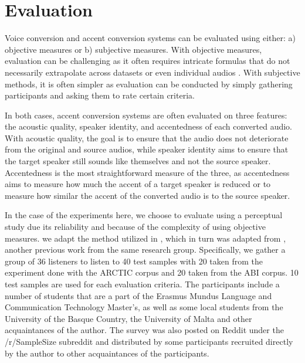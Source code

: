 \documentclass
[
    a4paper,
    twoside,
    12pt,
]
{report}
\begin{document}
\hypertarget{evaluation}{%
\section{Evaluation}\label{evaluation}}

Voice conversion and accent conversion systems can be evaluated using
either: a) objective measures or b) subjective measures. With objective
measures, evaluation can be challenging as it often requires intricate
formulas that do not necessarily extrapolate across datasets or even
individual audios \parencite{felps2010}. With subjective methods, it is
often simpler as evaluation can be conducted by simply gathering
participants and asking them to rate certain criteria.

In both cases, accent conversion systems are often evaluated on three
features: the acoustic quality, speaker identity, and accentedness of
each converted audio. With acoustic quality, the goal is to ensure that
the audio does not deteriorate from the original and source audios,
while speaker identity aims to ensure that the target speaker still
sounds like themselves and not the source speaker. Accentedness is the
most straightforward measure of the three, as accentedness aims to
measure how much the accent of a target speaker is reduced or to measure
how similar the accent of the converted audio is to the source speaker.

In the case of the experiments here, we choose to evaluate using a
perceptual study due its reliability and because of the complexity of
using objective measures. we adapt the method utilized in
\textcite{zhao2018a}, which in turn was adapted from
\textcite{aryal2014}, another previous work from the same research
group. Specifically, we gather a group of 36 listeners to listen to 40
test samples with 20 taken from the experiment done with the ARCTIC
corpus and 20 taken from the ABI corpus. 10 test samples are used for
each evaluation criteria. The participants include a number of students
that are a part of the Erasmus Mundus Language and Communication
Technology Master's, as well as some local students from the University
of the Basque Country, the University of Malta and other acquaintances
of the author. The survey was also posted on Reddit under the
/r/SampleSize subreddit and distributed by some participants recruited
directly by the author to other acquaintances of the participants.
\end{document}
